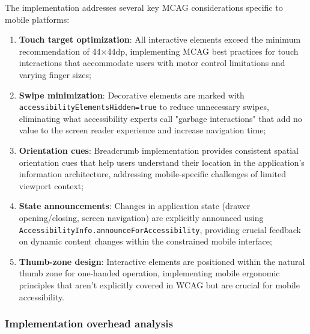 The implementation addresses several key MCAG considerations specific to mobile platforms:
\begin{enumerate}
    \item \textbf{Touch target optimization}: All interactive elements exceed the minimum recommendation of 44×44dp, implementing MCAG best practices for touch interactions that accommodate users with motor control limitations and varying finger sizes;
    
    \item \textbf{Swipe minimization}: Decorative elements are marked with \\ \texttt{accessibilityElementsHidden=true} to reduce unnecessary swipes, eliminating what accessibility experts call "garbage interactions" that add no value to the screen reader experience and increase navigation time;
    
    \item \textbf{Orientation cues}: Breadcrumb implementation provides consistent spatial orientation cues that help users understand their location in the application's information architecture, addressing mobile-specific challenges of limited viewport context;
    
    \item \textbf{State announcements}: Changes in application state (drawer opening/closing, screen navigation) are explicitly announced using \\\texttt{AccessibilityInfo.announceForAccessibility}, providing crucial feedback on dynamic content changes within the constrained mobile interface;
    
    \item \textbf{Thumb-zone design}: Interactive elements are positioned within the natural thumb zone for one-handed operation, implementing mobile ergonomic principles that aren't explicitly covered in WCAG but are crucial for mobile accessibility.
\end{enumerate}

\subsubsection{Implementation overhead analysis}

